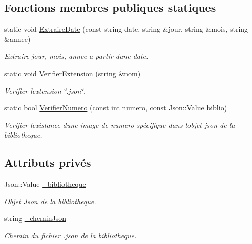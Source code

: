 \subsection*{Fonctions membres publiques statiques}
\begin{DoxyCompactItemize}
\item 
static void \hyperlink{classBibliotheque_af2649bd20b0cf9cd35165abee4a45a12}{Extraire\+Date} (const string date, string \&jour, string \&mois, string \&annee)
\begin{DoxyCompactList}\small\item\em Extraire jour, mois, annee a partir d\textquotesingle{}une date. \end{DoxyCompactList}\item 
static void \hyperlink{classBibliotheque_a0756c71060d89b307c1a051fdeee6051}{Verifier\+Extension} (string \&nom)
\begin{DoxyCompactList}\small\item\em Verifier l\textquotesingle{}extension \char`\"{}.\+json\char`\"{}. \end{DoxyCompactList}\item 
static bool \hyperlink{classBibliotheque_a66606b7018ddd339af2a608ea4e6de9c}{Verifier\+Numero} (const int numero, const Json\+::\+Value biblio)
\begin{DoxyCompactList}\small\item\em Verifier l\textquotesingle{}existance d\textquotesingle{}une image de numero spécifique dans l\textquotesingle{}objet json de la bibliotheque. \end{DoxyCompactList}\end{DoxyCompactItemize}
\subsection*{Attributs privés}
\begin{DoxyCompactItemize}
\item 
\mbox{\label{classBibliotheque_a15a693b9eedd442d0cc00489b5ea6e5e}} 
Json\+::\+Value \hyperlink{classBibliotheque_a15a693b9eedd442d0cc00489b5ea6e5e}{\+\_\+bibliotheque}
\begin{DoxyCompactList}\small\item\em Objet Json de la bibliotheque. \end{DoxyCompactList}\item 
\mbox{\label{classBibliotheque_a9628b7dc59bbb3894c17634addc8016a}} 
string \hyperlink{classBibliotheque_a9628b7dc59bbb3894c17634addc8016a}{\+\_\+chemin\+Json}
\begin{DoxyCompactList}\small\item\em Chemin du fichier .json de la bibliotheque. \end{DoxyCompactList}\end{DoxyCompactItemize}


